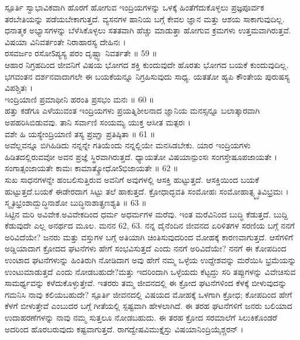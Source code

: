  ಸ್ಪೂರ್ತಿ 
 ಸ್ವಾಭಾವಿಕವಾಗಿ ಹೊರಗೆ ಹೋಗುವ ಇಂದ್ರಿಯಗಳನ್ನು ಒಳಕ್ಕೆ ಹಿಂತೆಗೆದುಕೊಳ್ಳಲು ಪ್ರಜ್ಞಪೂರ್ವಕ ತರಬೇತಿಯನ್ನು ಪಡೆಯಬೇಕಾಗುತ್ತದೆ. ವ್ಯಸನಗಳ ಹಾನಿಯ ಬಗ್ಗೆ ಕೇವಲ ಜ್ಞಾನ ಮತ್ತು ಆಶಯ ಸಾಕಾಗುವುದಿಲ್ಲ. ಧನಾತ್ಮಕ ಅಭ್ಯಾಸಗಳನ್ನು ಬೆಳೆಸಿಕೊಳ್ಳಲು ಸತತವಾಗಿ ಹೆಚ್ಚು ಮಾಡುತ್ತಾ ಹೋಗುವ ಕ್ರಮಗಳು ಉತ್ತಮವಾಗಿರುತ್ತವೆ.
ವಿಷಯಾ ವಿನಿವರ್ತಂತೇ ನಿರಾಹಾರಸ್ಯ ದೇಹಿನಃ ।\\
ರಸವರ್ಜಂ ರಸೋऽಪ್ಯಸ್ಯ ಪರಂ ದೃಷ್ಟ್ವಾ ನಿವರ್ತತೇ ॥ 59 ॥\\
 ಆಹಾರ ನಿಗ್ರಹದಿಂದ ಜೀವನಿಗೆ ವಿಷಯ ಭೋಗದ ಶಕ್ತಿ ಕುಂದುವುದೇ ಹೊರತು ಭೋಗದ ಬಯಕೆ ಕುಂದುವುದಿಲ್ಲ. ಭಗವಂತನ ದರ್ಶನವಾದಾಗಲೇ ಈ ಬಯಕೆಯನ್ನೂ ನಿಗ್ರಹಿಸುವುದು ಸಾಧ್ಯ.
ಯತತೋ ಹ್ಯಪಿ ಕೌಂತೇಯ ಪುರುಷಸ್ಯ ವಿಪಶ್ಚಿತಃ ।\\
ಇಂದ್ರಿಯಾಣಿ ಪ್ರಮಾಥೀನಿ ಹರಂತಿ ಪ್ರಸಭಂ ಮನಃ ॥ 60 ॥\\
 ಹತ್ತು ಕಡೆಗೂ ಎಳೆಯುವಂತ ಇಂದ್ರಿಯಗಳು ಪ್ರಯತ್ನಿಶೀಲನಾದ ಜ್ಞಾನಿಯ ಮನಸ್ಸನ್ನೂ ಬಲಾತ್ಕಾರವಾಗಿ ಅಪಹರಿಸಿಬಿಡುವವು.
ತಾನಿ ಸರ್ವಾಣಿ ಸಂಯಮ್ಯ ಯುಕ್ತ ಆಸೀತ ಮತ್ಪರಃ ।\\
ವಶೇ ಹಿ ಯಸ್ಯೇಂದ್ರಿಯಾಣಿ ತಸ್ಯ ಪ್ರಙ್ಞಾ ಪ್ರತಿಷ್ಠಿತಾ ॥ 61 ॥\\
 ಅವೆಲ್ಲವನ್ನೂ ಬಿಗಿಹಿಡಿದು ನನ್ನನ್ನೇ ಗತಿಯೆಂದು ನನ್ನಲ್ಲಿಯೇ ಮನಸಿಡಬೇಕು. ಯಾರ ಇಂದ್ರಿಯಗಳು ಹಿಡಿತದಲ್ಲಿರುವವೋ ಅವನ ಪ್ರಜ್ಞೆ ಸ್ಥಿರವಾಗಿರುತ್ತದೆ.
ಧ್ಯಾಯತೋ ವಿಷಯಾನ್ಪುಂಸಃ ಸಂಗಸ್ತೇಷೂಪಜಾಯತೇ ।\\
ಸಂಗಾತ್ಸಂಜಾಯತೇ ಕಾಮಃ ಕಾಮಾತ್ಕ್ರೋಧೋऽಭಿಜಾಯತೇ ॥ 62 ॥\\
 ಸುಖ ಸಾಧನಗಳನ್ನೇ ಹಂಬಲಿಸುತ್ತಿರುವ ಅವನಿಗೆ ಅವುಗಳಲ್ಲಿ ಆಸಕ್ತಿ ಹುಟ್ಟುತ್ತದೆ. ಆಸಕ್ತಿಯಿಂದ ಬಯಕೆ ಹುಟ್ಟುತ್ತದೆ.ಬಯಕೆ ಈಡೇರದಾಗ ಸಿಟ್ಟು ತಲೆ ಹಾಕುತ್ತದೆ.
ಕ್ರೋಧಾದ್ಭವತಿ ಸಂಮೋಹಃ ಸಂಮೋಹಾತ್ಸ್ಮೃತಿವಿಭ್ರಮಃ ।\\
ಸ್ಮೃತಿಭ್ರಂಶಾದ್ಬುದ್ಧಿನಾಶೋ ಬುದ್ಧಿನಾಶಾತ್ಪ್ರಣಶ್ಯತಿ ॥ 63 ॥\\
 ಸಿಟ್ಟಿನ ಮರಿ ಅವಿವೇಕ.ಅವಿವೇಕದಿಂದ ಧರ್ಮ ಅಧರ್ಮಗಳ ಮರೆವು. ಇಂತ ಮರೆವಿನಿಂದ ಬುದ್ಧಿ ಕೆಡುತ್ತದೆ. ಬುದ್ದಿ ಕೆಡುವುದೇ ಎಲ್ಲ ಅನರ್ಥದ ಮೂಲ.
ಮನನ 62, 63. 
 ನನ್ನ ದೈನೆಂದಿನ ಜೀವನದ ಏರಿಳಿತಗಳ ಸರಣಿಯ ಬಗ್ಗೆ ನನಗೆ ಅರಿವಿದೆಯೇ? ಜನರು ಮತ್ತು ವಸ್ತುಗಳ ಬಗ್ಗೆ ಅತಿಯಾಗಿ ಚಿಂತಿಸುವುದರಿಂದ ಮೋಹಕ್ಕೆ ಕಾರಣವಾಗುತ್ತದೆ. ಆಸೆಗಳಿಗೆ  ಅಡ್ಡಿಯಾದಾಗ ಕ್ರೋದದ ಘಟನೆಗಳು ಹೇಗೆ ಸಂಭವಿಸುತ್ತದೆ ಎಂದು ನನಗೆ ಅರಿವಿದೆಯೇ? ನನಗೆ ಈ ಕೋಪದಿಂದ ಉಂಟಾದ ಘಟನೆಗಳುನ್ನು ಹಿಂತಿರುಗಿ ನೋಡಿದಾಗ ಅವು ಹೇಗೆ ನಮ್ಮ ಒಳ್ಳೆಯ ಉದ್ದೇಶವನ್ನು ಮರೆಯಿಸಿ ಭ್ರಮೆಯನ್ನು ಉಂಟುಮಾಡುತ್ತದೆ ಎಂದು ನೋಡಬಹುದೇ?ಮತ್ತು  ಇದರಿಂದಾಗಿ ಒಳ್ಳೆಯದು ಕೆಟ್ಟದ್ದು ಸರಿ ತಪ್ಪುಗಳನ್ನು ವಿವೇಚಿಸುವ ಸಾಮರ್ಥ್ಯವನ್ನು ಕಳೆದುಕೊಳ್ಳುತ್ತೇವೆ. ಇತರರು ತಮ್ಮ ಜೀವನದಲ್ಲಿ ಈ ಕ್ರೋದ ಘಟನೆಗಳಿಂದ ಕೆಳಕ್ಕೆ ಬೀಳುವುದನ್ನು ಗಮನಿಸಿ ನಾವು ಕಲಿಯಬಹುದೇ? 
 ಸ್ಪೂರ್ತಿ  
 ಜೀವನದಲ್ಲಿ ವಿಷಯದ ಮೋಹಕ್ಕೆ ಒಳಗಾಗಿ ಕ್ರೋಧ; ಕೋಪದಿಂದ ಹೇಗೆ ಕೆಳಗೆ ಬೀಳುತ್ತೇವೆ ಎಂಬುದರ ಬಗ್ಗೆ ಗೀತೆಯಲ್ಲಿ ಸ್ಪಷ್ಟವಾಗಿ  ಹೇಳಲಾಗಿದೆ. ಈ ತರಹ ಘಟನೆಗಳಿಗೆ ಜನರು ಬಲಿಯಾದ ಉದಾಹರಣೆಗಳನ್ನು ನಾವು ನಮ್ಮ ಸುತ್ತಲೂ ನೋಡಬಹುದು. ಈ ತರಹ ಕ್ರೋದ ಸರಮಾಲೆಗೆ ಸಿಲುಕಿಕೊಂಡರೆ ಅದರಿಂದ ಹೊರಬರುವುದು ಕಷ್ಟವಾಗುತ್ತದೆ. 
ರಾಗದ್ವೇಷವಿಮುಕ್ತೈಸ್ತು ವಿಷಯಾನಿಂದ್ರಿಯೈಶ್ಚರನ್ ।\\
